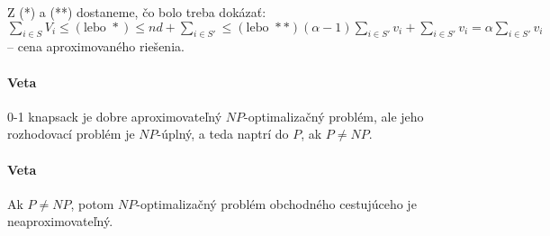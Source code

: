 \documentclass{article}
\begin{document}
\par Z (*) a (**) dostaneme, čo bolo treba dokázať:
$\sum_{i\in S} V_i \leq (\mbox{lebo } *) \leq nd + \sum_{i\in S'} \leq
(\mbox{lebo } **) (\alpha-1)\sum_{i\in S'} v_i + \sum_{i \in S'}v_i =
\alpha\sum_{i\in S'}v_i$ -- cena aproximovaného riešenia.

\paragraph{Veta} 0-1 knapsack je dobre aproximovateľný $NP$-optimalizačný
problém, ale jeho rozhodovací problém je $NP$-úplný, a teda naptrí do $P$, ak
$P \neq NP$.

\paragraph{Veta} Ak $P \neq NP$, potom $NP$-optimalizačný problém obchodného
cestujúceho je neaproximovateľný.
\end{document}
